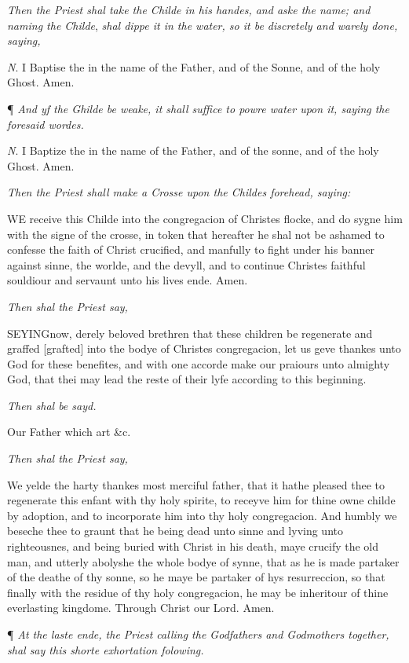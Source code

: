 \emph{Then the Priest shal take the Childe in his handes, and aske the name;
and naming the Childe}, \emph{shal dippe it in the water, so it be discretely
and warely done, saying,}

\emph{N}. I Baptise the in the name of the Father, and of the Sonne, and
of the holy Ghost. Amen.

¶
\emph{And yf the Ghilde be weake, it shall suffice to powre water upon it,
saying the foresaid wordes.}

\emph{N}. I Baptize the in the name of the Father, and of the sonne, and
of the holy Ghost. Amen.

\emph{Then
the Priest shall make a Crosse upon the Childes forehead, saying:}

WE
receive this Childe into the congregacion of Christes flocke, and do sygne
him with the signe of the crosse, in token that hereafter he shal not
be ashamed to confesse the faith of Christ crucified, and manfully to
fight under his banner against sinne, the worlde, and the devyll, and
to continue Christes faithful souldiour and servaunt unto his lives ende.
Amen.

\emph{Then
shal the Priest say,}

SEYING\textbf{}now, derely beloved brethren that these children be regenerate and
graffed [grafted]
into the bodye of Christes congregacion, let us geve thankes unto God
for these benefites, and with one accorde make our praiours unto almighty
God, that thei may lead the reste of their lyfe according to this beginning.

\emph{Then
shal be sayd.}

Our Father which art \&c.

\emph{Then
shal the Priest say,}

We yelde the harty thankes most merciful father, that it hathe pleased
thee to regenerate this enfant with thy holy spirite, to receyve him for
thine owne childe by adoption, and to incorporate him into thy holy congregacion.
And humbly we beseche thee to graunt that he being dead unto sinne and
lyving unto righteousnes, and being buried with Christ in his death, maye
crucify the old man, and utterly abolyshe the whole bodye of synne, that
as he is made partaker of the deathe of thy sonne, so he maye be partaker
of hys resurreccion, so that finally with the residue of thy holy congregacion,
he may be inheritour of thine everlasting kingdome. Through Christ our
Lord. Amen.

¶
\emph{At the laste ende, the Priest calling the Godfathers and Godmothers
together, shal say this shorte exhortation folowing.}

